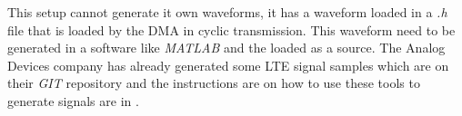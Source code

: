 This setup cannot generate it own waveforms, it has a waveform loaded in a
\emph{.h} file that is loaded by the DMA in cyclic transmission. This waveform
need to be generated in a software like \emph{MATLAB} and the loaded as a
source. The Analog Devices company has already generated some LTE signal samples
which are on their \emph{GIT} repository \cite{web:gitanalogdevlte} and the
instructions are on how to use these tools to generate signals are in
\cite{web:analogmatlabwiki}.
%
%
%
